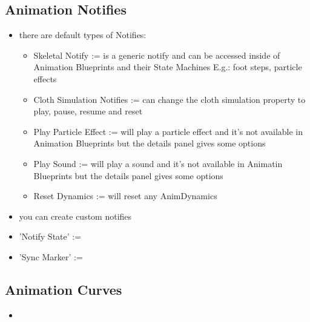         \subsection{Animation Notifies}
            \begin{itemize}
                \item there are default types of Notifies:
                \begin{itemize}
                    \item Skeletal Notify := is a generic notify and can be accessed inside of Animation Blueprints and their State Machines E.g.: foot steps, particle effects
                    \item Cloth Simulation Notifies := can change the cloth simulation property to play, pause, resume and reset 
                    \item Play Particle Effect := will play a particle effect and it's not available in Animation Blueprints but the details panel gives some options
                    \item Play Sound := will play a sound and it's not available in Animatin Blueprints but the details panel gives some options
                    \item Reset Dynamics := will reset any AnimDynamics
                \end{itemize}
                \item you can create custom notifies
                \item 'Notify State' := 
                \item 'Sync Marker' :=
            \end{itemize}

        \subsection{Animation Curves}
            \begin{itemize}
                \item 
            \end{itemize}

